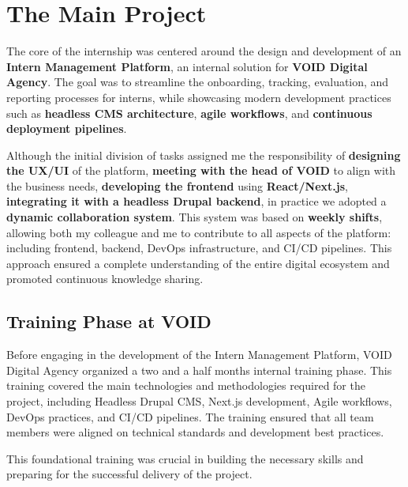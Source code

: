 \section{The Main Project}
\noindent
The core of the internship was centered around the design and development of an \textbf{Intern Management Platform}, an internal solution for \textbf{VOID Digital Agency}. The goal was to streamline the onboarding, tracking, evaluation, and reporting processes for interns, while showcasing modern development practices such as \textbf{headless CMS architecture}, \textbf{agile workflows}, and \textbf{continuous deployment pipelines}.

\medskip

\noindent
Although the initial division of tasks assigned me the responsibility of \textbf{designing the UX/UI} of the platform, \textbf{meeting with the head of VOID} to align with the business needs, \textbf{developing the frontend} using \textbf{React/Next.js}, \textbf{integrating it with a headless Drupal backend}, in practice we adopted a \textbf{dynamic collaboration system}.  
This system was based on \textbf{weekly shifts}, allowing both my colleague and me to contribute to all aspects of the platform: including frontend, backend, DevOps infrastructure, and CI/CD pipelines.  
This approach ensured a complete understanding of the entire digital ecosystem and promoted continuous knowledge sharing.

\subsection{Training Phase at VOID}
\noindent
Before engaging in the development of the Intern Management Platform, VOID Digital Agency organized a two and a half months internal training phase. This training covered the main technologies and methodologies required for the project, including Headless Drupal CMS, Next.js development, Agile workflows, DevOps practices, and CI/CD pipelines.  
The training ensured that all team members were aligned on technical standards and development best practices.  


\medskip
\noindent
This foundational training was crucial in building the necessary skills and preparing for the successful delivery of the project.

